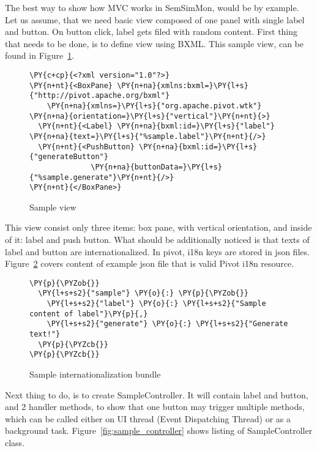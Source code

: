 The best way to show how MVC works in SemSimMon, would be by example. Let us assume, that we need basic view composed of one
panel with single label and button. On button click, label gets filed with random content. First thing that needs to be
done, is to define view using BXML. This sample view, can be found in Figure~\ref{fig:sample_view}.

\begin{figure}[ht]
  \centering
    
\begin{Verbatim}[commandchars=\\\{\},frame=single,framerule=0.2pt]                                                    
\PY{c+cp}{<?xml version="1.0"?>}
\PY{n+nt}{<BoxPane} \PY{n+na}{xmlns:bxml=}\PY{l+s}{"http://pivot.apache.org/bxml"}
    \PY{n+na}{xmlns=}\PY{l+s}{"org.apache.pivot.wtk"} \PY{n+na}{orientation=}\PY{l+s}{"vertical"}\PY{n+nt}{>}
  \PY{n+nt}{<Label} \PY{n+na}{bxml:id=}\PY{l+s}{"label"} \PY{n+na}{text=}\PY{l+s}{"%sample.label"}\PY{n+nt}{/>}
  \PY{n+nt}{<PushButton} \PY{n+na}{bxml:id=}\PY{l+s}{"generateButton"}
              \PY{n+na}{buttonData=}\PY{l+s}{"%sample.generate"}\PY{n+nt}{/>}
\PY{n+nt}{</BoxPane>}
\end{Verbatim} 
  \caption{Sample view}
  \label{fig:sample_view}
\end{figure}

This view consist only three items: box pane, with vertical orientation, and inside of it: label and push button. What
should be additionally noticed is that texts of label and button are internationalized. In pivot, i18n keys are stored
in json files. Figure~\ref{fig:i18n} covers content of example json file that is valid Pivot i18n resource. 

\begin{figure}[ht]
  \centering
    
\begin{Verbatim}[commandchars=\\\{\},frame=single,framerule=0.2pt]                                                    
\PY{p}{\PYZob{}}
  \PY{l+s+s2}{"sample"} \PY{o}{:} \PY{p}{\PYZob{}}
    \PY{l+s+s2}{"label"} \PY{o}{:} \PY{l+s+s2}{"Sample content of label"}\PY{p}{,}
    \PY{l+s+s2}{"generate"} \PY{o}{:} \PY{l+s+s2}{"Generate text!"}
  \PY{p}{\PYZcb{}}
\PY{p}{\PYZcb{}}
\end{Verbatim} 
  \caption{Sample internationalization bundle}
  \label{fig:i18n}
\end{figure}

Next thing to do, is to create SampleController. It will contain label and button, and 2 handler methods, to show that
one button may trigger multiple methods, which can be called either on UI thread (Event Dispatching Thread) or as a
background task. Figure~\ref{fig:sample_controller} shows listing of SampleController class. 

